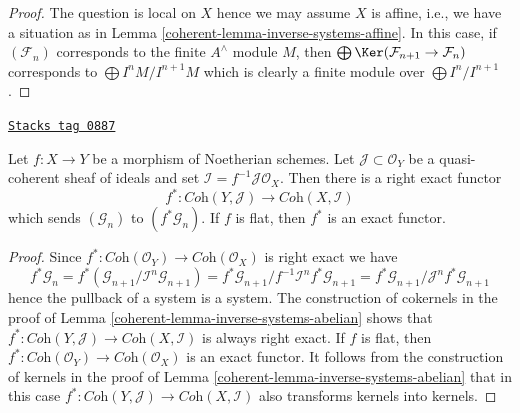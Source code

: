 \begin{proof}

The question is local on $X$ hence we may assume $X$ is affine, i.e.,
we have a situation as in Lemma \ref{coherent-lemma-inverse-systems-affine}.
In this case, if $(\mathcal{F}_n)$ corresponds to the finite $A^\wedge$
module $M$, then $\bigoplus \Ker(\mathcal{F}_{n + 1} \to \mathcal{F}_n)$
corresponds to $\bigoplus I^nM/I^{n + 1}M$ which is clearly a finite
module over $\bigoplus I^n/I^{n + 1}$.
\end{proof}

\begin{lemma}
\label{coherent-lemma-inverse-systems-pullback}
\href{https://stacks.math.columbia.edu/tag/0887}{\texttt{Stacks tag 0887}}

Let $f : X \to Y$ be a morphism of Noetherian schemes.
Let $\mathcal{J} \subset \mathcal{O}_Y$ be a quasi-coherent sheaf
of ideals and set $\mathcal{I} = f^{-1}\mathcal{J} \mathcal{O}_X$.
Then there is a right exact functor
$$
f^* : \textit{Coh}(Y, \mathcal{J}) \longrightarrow \textit{Coh}(X, \mathcal{I})
$$
which sends $(\mathcal{G}_n)$ to $(f^*\mathcal{G}_n)$. If $f$ is flat,
then $f^*$ is an exact functor.
\end{lemma}

\begin{proof}

Since $f^* : \textit{Coh}(\mathcal{O}_Y) \to \textit{Coh}(\mathcal{O}_X)$
is right exact we have
$$
f^*\mathcal{G}_n =
f^*(\mathcal{G}_{n + 1}/\mathcal{I}^n\mathcal{G}_{n + 1}) =
f^*\mathcal{G}_{n + 1}/f^{-1}\mathcal{I}^nf^*\mathcal{G}_{n + 1} =
f^*\mathcal{G}_{n + 1}/\mathcal{J}^nf^*\mathcal{G}_{n + 1}
$$
hence the pullback of a system is a system. The construction of
cokernels in the proof of Lemma \ref{coherent-lemma-inverse-systems-abelian}
shows that
$f^* : \textit{Coh}(Y, \mathcal{J}) \to \textit{Coh}(X, \mathcal{I})$
is always right exact. If $f$ is flat, then
$f^* : \textit{Coh}(\mathcal{O}_Y) \to \textit{Coh}(\mathcal{O}_X)$
is an exact functor. It follows from the construction of kernels
in the proof of Lemma \ref{coherent-lemma-inverse-systems-abelian}
that in this case
$f^* : \textit{Coh}(Y, \mathcal{J}) \to \textit{Coh}(X, \mathcal{I})$
also transforms kernels into kernels.
\end{proof}

